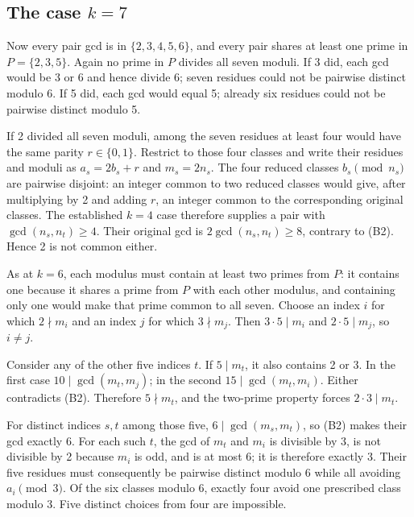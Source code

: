 \documentclass[11pt,a4paper]{article}
\begin{document}
\subsection{\texorpdfstring{The case \(k=7\)}{The case k=7}}\label{the-case-k7}

Now every pair gcd is in \(\{2,3,4,5,6\}\), and every pair shares at least one prime in \(P=\{2,3,5\}\). Again no prime in \(P\) divides all seven moduli. If 3 did, each gcd would be 3 or 6 and hence divide 6; seven residues could not be pairwise distinct modulo 6. If 5 did, each gcd would equal 5; already six residues could not be pairwise distinct modulo 5.

If 2 divided all seven moduli, among the seven residues at least four would have the same parity \(r\in\{0,1\}\). Restrict to those four classes and write their residues and moduli as \(a_s=2b_s+r\) and \(m_s=2n_s\). The four reduced classes \(b_s\pmod{n_s}\) are pairwise disjoint: an integer common to two reduced classes would give, after multiplying by 2 and adding \(r\), an integer common to the corresponding original classes. The established \(k=4\) case therefore supplies a pair with \(\gcd(n_s,n_t)\ge4\). Their original gcd is \(2\gcd(n_s,n_t)\ge8\), contrary to (B2). Hence 2 is not common either.

As at \(k=6\), each modulus must contain at least two primes from \(P\): it contains one because it shares a prime from \(P\) with each other modulus, and containing only one would make that prime common to all seven. Choose an index \(i\) for which \(2\nmid m_i\) and an index \(j\) for which \(3\nmid m_j\). Then \(3\cdot5\mid m_i\) and \(2\cdot5\mid m_j\), so \(i\ne j\).

Consider any of the other five indices \(t\). If \(5\mid m_t\), it also contains 2 or 3. In the first case \(10\mid\gcd(m_t,m_j)\); in the second \(15\mid\gcd(m_t,m_i)\). Either contradicts (B2). Therefore \(5\nmid m_t\), and the two-prime property forces \(2\cdot3\mid m_t\).

For distinct indices \(s,t\) among those five, \(6\mid\gcd(m_s,m_t)\), so (B2) makes their gcd exactly 6. For each such \(t\), the gcd of \(m_t\) and \(m_i\) is divisible by 3, is not divisible by 2 because \(m_i\) is odd, and is at most 6; it is therefore exactly 3. Their five residues must consequently be pairwise distinct modulo 6 while all avoiding \(a_i\pmod3\). Of the six classes modulo 6, exactly four avoid one prescribed class modulo 3. Five distinct choices from four are impossible.
\end{document}
